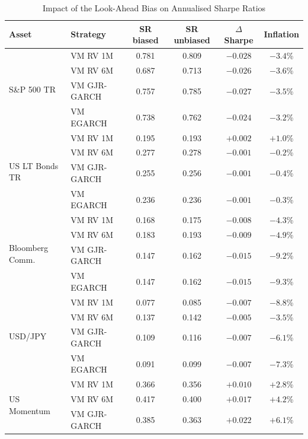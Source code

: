 \documentclass[12pt, a4paper]{article}
\begin{document}
\begin{table}[H]
  \centering
  \caption{Impact of the Look-Ahead Bias on Annualised Sharpe Ratios}
  \label{tab:lookahead_bias}
  \footnotesize
  \begin{tabular}{llcccc}
    \toprule
    \textbf{Asset} & \textbf{Strategy}
                   & \textbf{SR biased} & \textbf{SR unbiased}
                   & \textbf{$\Delta$ Sharpe} & \textbf{Inflation} \\
    \midrule
    \multirow{4}{*}{S\&P 500 TR}
      & VM RV 1M    & 0.781 & 0.809 & $-0.028$ & $-3.4$\% \\
      & VM RV 6M    & 0.687 & 0.713 & $-0.026$ & $-3.6$\% \\
      & VM GJR-GARCH& 0.757 & 0.785 & $-0.027$ & $-3.5$\% \\
      & VM EGARCH   & 0.738 & 0.762 & $-0.024$ & $-3.2$\% \\
    \midrule
    \multirow{4}{*}{US LT Bonds TR}
      & VM RV 1M    & 0.195 & 0.193 & $+0.002$ & $+1.0$\% \\
      & VM RV 6M    & 0.277 & 0.278 & $-0.001$ & $-0.2$\% \\
      & VM GJR-GARCH& 0.255 & 0.256 & $-0.001$ & $-0.4$\% \\
      & VM EGARCH   & 0.236 & 0.236 & $-0.001$ & $-0.3$\% \\
    \midrule
    \multirow{4}{*}{Bloomberg Comm.}
      & VM RV 1M    & 0.168 & 0.175 & $-0.008$ & $-4.3$\% \\
      & VM RV 6M    & 0.183 & 0.193 & $-0.009$ & $-4.9$\% \\
      & VM GJR-GARCH& 0.147 & 0.162 & $-0.015$ & $-9.2$\% \\
      & VM EGARCH   & 0.147 & 0.162 & $-0.015$ & $-9.3$\% \\
    \midrule
    \multirow{4}{*}{USD/JPY}
      & VM RV 1M    & 0.077 & 0.085 & $-0.007$ & $-8.8$\% \\
      & VM RV 6M    & 0.137 & 0.142 & $-0.005$ & $-3.5$\% \\
      & VM GJR-GARCH& 0.109 & 0.116 & $-0.007$ & $-6.1$\% \\
      & VM EGARCH   & 0.091 & 0.099 & $-0.007$ & $-7.3$\% \\
    \midrule
    \multirow{4}{*}{US Momentum}
      & VM RV 1M    & 0.366 & 0.356 & $+0.010$ & $+2.8$\% \\
      & VM RV 6M    & 0.417 & 0.400 & $+0.017$ & $+4.2$\% \\
      & VM GJR-GARCH& 0.385 & 0.363 & $+0.022$ & $+6.1$\% \\

\end{tabular}
\end{table}
\end{document}
